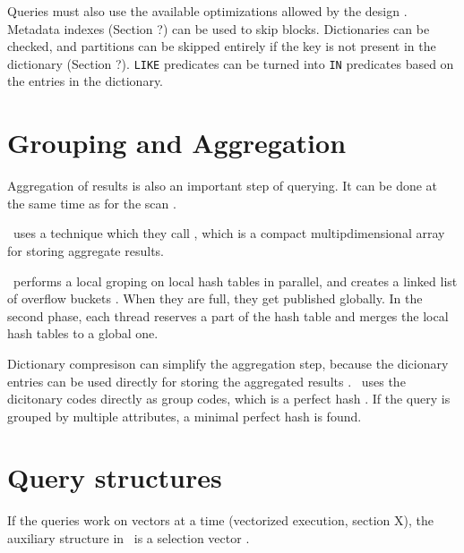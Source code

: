 Queries must also use the available optimizations allowed by the design \cite{Barber2012-xt}. Metadata indexes (Section ?) can be used to skip blocks. Dictionaries can be checked, and partitions can be skipped entirely if the key is not present in the dictionary (Section ?). \texttt{LIKE} predicates can be turned into \texttt{IN} predicates based on the entries in the dictionary.

\section{Grouping and Aggregation}
\label{sec:Grouping and Aggregation}
Aggregation of results is also an important step of querying. It can be done at the same time as for the scan \cite{Leme2010-is}.

\oracle~uses a technique which they call , which is a compact multipdimensional array for storing aggregate results.

\ibm~performs a local groping on local hash tables in parallel, and creates a linked list of overflow buckets \cite{Raman2013-em}. When they are full, they get published globally. In the second phase, each thread reserves a part of the hash table and merges the local hash tables to a global one.

Dictionary compresison can simplify the aggregation step, because the dicionary entries can be used directly for storing the aggregated results \cite{Lemke2010-is, Boncz2005-wj}. \blink~uses the dicitonary codes directly as group codes, which is a perfect hash \cite{Raman2008-gi}. If the query is grouped by multiple attributes, a minimal perfect hash is found. 

\section{Query structures}
\label{sec:Query structures}
If the queries work on vectors at a time (vectorized execution, section X), the auxiliary structure in \monetx~is a selection vector \cite{Boncz2005-wj}.



